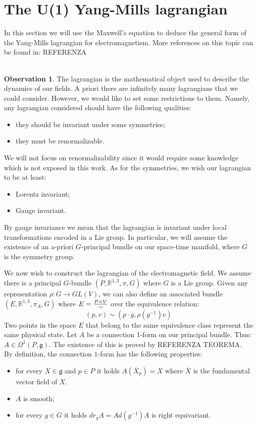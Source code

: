 \documentclass[12pt,a4paper]{report}
\theoremstyle{definition}
\theoremstyle{Theorem}
\theoremstyle{definition}
\theoremstyle{definition}
\newtheorem{Obs}[Def]{Observation}
\begin{document}
	\section{The U(1) Yang-Mills lagrangian}
	In this section we will use the Maxwell's equation to deduce the general form of the Yang-Mills lagrangian for electromagnetism. More references on this topic can be found in: REFERENZA
	\\
	\\
	\begin{Obs}
		The lagrangian is the mathematical object used to describe the dynamics of our fields. A priori there are infinitely many lagrangians that we could consider. However, we would like to set some restrictions to them. Namely, any lagrangian considered should have the following qualities:
		\begin{itemize}
			\item they should be invariant under some symmetries;
			\item they must be renormalizable.
		\end{itemize}
		We will not focus on renormalizability since it would require some knowledge which is not exposed in this work. As for the symmetries, we wish our lagrangian to be at least:
		\begin{itemize}
			\item Lorentz invariant;
			\item Gauge invariant.
		\end{itemize}
		By gauge invariance we mean that the lagrangian is invariant under local transformations encoded in a Lie group. In particular, we will assume the existence of an a-priori $G$-principal bundle on our space-time manifold, where $G$ is the symmetry group. 
	\end{Obs}
	We now wish to construct the lagrangian of the electromagnetic field. We assume there is a principal $G$-bundle $(P,\mathbb{R}^{1,3},\pi,G)$ where $G$ is a Lie group. Given any representation $\rho:G\rightarrow GL(V)$, we can also define an associated bundle $(E,\mathbb{R}^{1,3},\pi_A,G)$ where $E={P\times V\over \sim}$ over the equivalence relation:
	$$(p,v)\sim(p\cdot g,\rho(g^{-1})v)$$
	Two points in the space $E$ that belong to the same equivalence class represent the same  physical state. Let $A$ be a connection 1-form on our principal bundle. Thus: $A\in\Omega^1(P,\mathfrak{g})$. The existence of this is proved by REFERENZA TEOREMA.\\
	By definition, the connection $1$-form has the following properties:
	\begin{itemize}
		\item for every $X\in \mathfrak{g}$ and $p\in P$ it holds $A(\overline{X}_p)=X$ where $\overline{X}$ is the fundamental vector field of $X$.
		\item $A$ is smooth;
		\item for every $g\in G$ it holds $dr_gA=Ad(g^{-1})A$ is right equivariant.
	\end{itemize}
\end{document}
